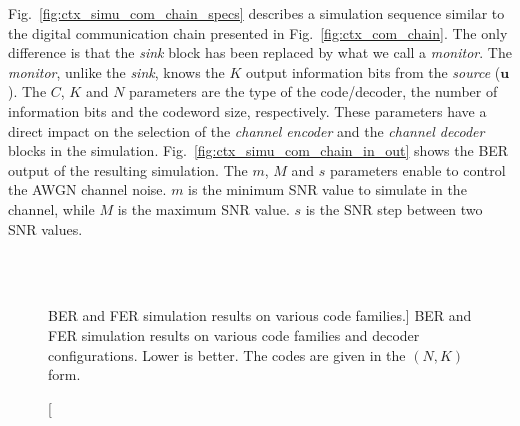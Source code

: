 Fig.~\ref{fig:ctx_simu_com_chain_specs} describes a simulation sequence similar
to the digital communication chain presented in Fig.~\ref{fig:ctx_com_chain}.
The only difference is that the \emph{sink} block has been replaced by what we
call a \emph{monitor}. The \emph{monitor}, unlike the \emph{sink}, knows the $K$
output information bits from the \emph{source} ($\bm{u}$). The $C$, $K$ and $N$
parameters are the type of the code/decoder, the number of information bits and
the codeword size, respectively. These parameters have a direct impact on the
selection of the \emph{channel encoder} and the \emph{channel decoder} blocks
in the simulation. Fig.~\ref{fig:ctx_simu_com_chain_in_out} shows the BER output
of the resulting simulation. The $m$, $M$ and $s$ parameters enable to control
the AWGN channel noise. $m$ is the minimum SNR value to simulate in the channel,
while $M$ is the maximum SNR value. $s$ is the SNR step between two SNR values.

\begin{figure}[htp]
  \centering
     \quad{}
    \\
    \quad{}
      \\
   \quad{}
  \caption
    [BER and FER simulation results on various code families.]
    {BER and FER simulation results on various code families and decoder
    configurations. Lower is better. The codes are given in the $(N,K)$ form.}
  \label{fig:ctx_bfer}
\end{figure}

